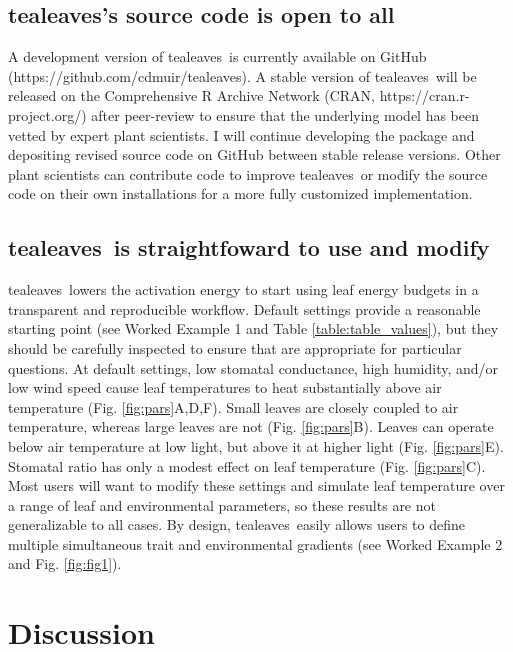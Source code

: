 \documentclass[11pt, oneside]{article}
\newcommand{\pkg}[1]{{\fontseries{b}\selectfont #1}}
\newcommand{\tealeaves}{\pkg{tealeaves}}
\begin{document}
\subsection*{\tealeaves's source code is open to all}

A development version of \tealeaves~is currently available on GitHub (https://github.com/cdmuir/tealeaves). A stable version of \tealeaves~will be released on the Comprehensive R Archive Network (CRAN, https://cran.r-project.org/) after peer-review to ensure that the underlying model has been vetted by expert plant scientists. I will continue developing the package and depositing revised source code on GitHub between stable release versions. Other plant scientists can contribute code to improve \tealeaves~or modify the source code on their own installations for a more fully customized implementation. 

\subsection*{\tealeaves~is straightfoward to use and modify}

\tealeaves~lowers the activation energy to start using leaf energy budgets in a transparent and reproducible workflow. Default settings provide a reasonable starting point (see Worked Example 1 and Table \ref{table:table_values}), but they should be carefully inspected to ensure that are appropriate for particular questions. At default settings, low stomatal conductance, high humidity, and/or low wind speed cause leaf temperatures to heat substantially above air temperature (Fig. \ref{fig:pars}A,D,F). Small leaves are closely coupled to air temperature, whereas large leaves are not (Fig. \ref{fig:pars}B). Leaves can operate below air temperature at low light, but above it at higher light (Fig. \ref{fig:pars}E). Stomatal ratio has only a modest effect on leaf temperature (Fig. \ref{fig:pars}C). Most users will want to modify these settings and simulate leaf temperature over a range of leaf and environmental parameters, so these results are not generalizable to all cases. By design, \tealeaves~easily allows users to define multiple simultaneous trait and environmental gradients (see Worked Example 2 and Fig. \ref{fig:fig1}).

\section*{Discussion}
\end{document}
